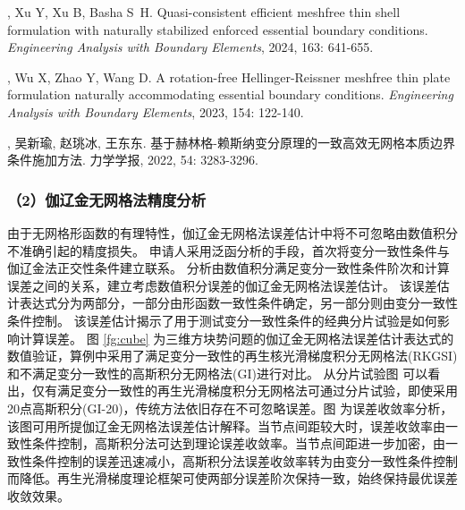 \vspace{-50pt}
\begin{thebibliography}{1}
	, Xu Y, Xu B, Basha S~H.
	\newblock Quasi-consistent efficient meshfree thin shell formulation with
	  naturally stabilized enforced essential boundary conditions.
	\newblock \emph{Engineering Analysis with Boundary Elements}, 2024, 163:
	  641-655.

	, Wu X, Zhao Y, Wang D.
	\newblock A rotation-free {{Hellinger-Reissner}} meshfree thin plate
	  formulation naturally accommodating essential boundary conditions.
	\newblock \emph{Engineering Analysis with Boundary Elements}, 2023, 154:
	  122-140.

	\textbf{}, 吴新瑜, 赵珧冰, 王东东.
	\newblock
	  {基于赫林格-赖斯纳变分原理的一致高效无网格本质边界条件施加方法}.
	\newblock 力学学报, 2022, 54: 3283-3296.

\end{thebibliography}

\subsubsection*{\bfseries （2）伽辽金无网格法精度分析}
由于无网格形函数的有理特性，伽辽金无网格法误差估计中将不可忽略由数值积分不准确引起的精度损失。
申请人采用泛函分析的手段，首次将变分一致性条件与伽辽金法正交性条件建立联系。
分析由数值积分满足变分一致性条件阶次和计算误差之间的关系，建立考虑数值积分误差的伽辽金无网格法误差估计。
该误差估计表达式分为两部分，一部分由形函数一致性条件确定，另一部分则由变分一致性条件控制。
该误差估计揭示了用于测试变分一致性条件的经典分片试验是如何影响计算误差。
图 \ref{fg:cube} 为三维方块势问题的伽辽金无网格法误差估计表达式的数值验证，算例中采用了满足变分一致性的再生核光滑梯度积分无网格法(RKGSI)和不满足变分一致性的高斯积分无网格法(GI)进行对比。
从分片试验图  可以看出，仅有满足变分一致性的再生光滑梯度积分无网格法可通过分片试验，即使采用20点高斯积分(GI-20)，传统方法依旧存在不可忽略误差。图  为误差收敛率分析，该图可用所提伽辽金无网格法误差估计解释。当节点间距较大时，误差收敛率由一致性条件控制，高斯积分法可达到理论误差收敛率。当节点间距进一步加密，由一致性条件控制的误差迅速减小，高斯积分法误差收敛率转为由变分一致性条件控制而降低。再生光滑梯度理论框架可使两部分误差阶次保持一致，始终保持最优误差收敛效果。

